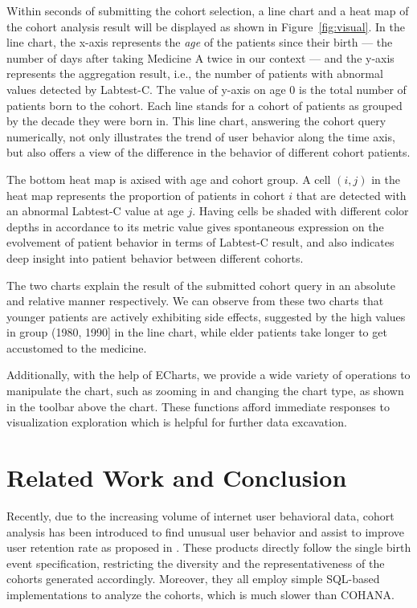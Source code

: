 Within seconds of submitting the cohort selection, a line chart and a heat map of the cohort analysis result will be displayed as shown in Figure~\ref{fig:visual}. In the line chart, the x-axis represents the \emph{age} of the patients since their {birth} --- the number of days after taking Medicine A twice in our context --- and the y-axis represents the aggregation result, i.e., the number of patients with abnormal values detected by Labtest-C. The value of y-axis on {age 0} is the total number of patients {born} to the cohort. 
Each line stands for a cohort of patients as grouped by the decade they were born in. 
This line chart, answering the cohort query numerically, not only illustrates the trend of user behavior along the time axis, but also offers a view of
the difference in the behavior of different cohort patients.

The bottom heat map is axised with {age} and cohort group. 
A cell $(i,j)$ in the heat map represents the proportion of patients in cohort $i$ that are detected with an abnormal Labtest-C value at age $j$. 
Having cells be shaded with different color depths in accordance to its metric value gives spontaneous expression on the evolvement of patient behavior in terms of Labtest-C result, and also indicates deep insight into patient behavior between different cohorts. 

The two charts explain the result of the submitted cohort query in an absolute and relative manner respectively. We can observe from these two charts that younger patients are actively exhibiting side effects, suggested by the high values in group (1980, 1990] in the line chart, while elder patients take longer to get accustomed to the medicine.%

Additionally, with the help of ECharts\cite{echarts}, we provide a wide variety of operations to manipulate the chart, such as zooming in and changing the chart type, as shown in the toolbar above the chart. These functions afford immediate responses to visualization exploration which is helpful for further data excavation.

\section{Related Work and Conclusion}

Recently, due to the increasing volume of internet user behavioral data, cohort
analysis has been introduced to find unusual user behavior and assist to
improve user retention rate as proposed in \cite{amplitude, mixpanel, rjmetrics}. These
products directly follow the single birth event specification, restricting the diversity and the representativeness of the cohorts generated accordingly.
Moreover, they all employ simple SQL-based implementations to analyze the cohorts, which is much slower than COHANA.

